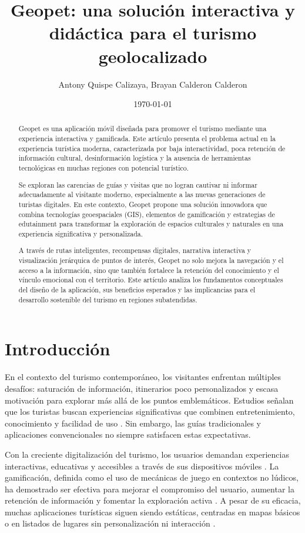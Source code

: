 \documentclass[12pt]{article}
\title{Geopet: una solución interactiva y didáctica para el turismo geolocalizado}
\author{Antony Quispe Calizaya, Brayan Calderon Calderon}
\date{\today}
\begin{document}
\maketitle

\begin{abstract}
Geopet es una aplicación móvil diseñada para promover el turismo mediante una experiencia interactiva y gamificada. Este artículo presenta el problema actual en la experiencia turística moderna, caracterizada por baja interactividad, poca retención de información cultural, desinformación logística y la ausencia de herramientas tecnológicas en muchas regiones con potencial turístico.

Se exploran las carencias de guías y visitas  que no logran cautivar ni informar adecuadamente al visitante moderno, especialmente a las nuevas generaciones de turistas digitales. En este contexto, Geopet propone una solución innovadora que combina tecnologías geoespaciales (GIS), elementos de gamificación y estrategias de edutainment para transformar la exploración de espacios culturales y naturales en una experiencia significativa y personalizada.

A través de rutas inteligentes, recompensas digitales, narrativa interactiva y visualización jerárquica de puntos de interés, Geopet no solo mejora la navegación y el acceso a la información, sino que también fortalece la retención del conocimiento y el vínculo emocional con el territorio. Este artículo analiza los fundamentos conceptuales del diseño de la aplicación, sus beneficios esperados y las implicancias para el desarrollo sostenible del turismo en regiones subatendidas.
\end{abstract}

\vspace{1cm}
\section{Introducción}
En el contexto del turismo contemporáneo, los visitantes enfrentan múltiples desafíos: saturación de información, itinerarios poco personalizados y escasa motivación para explorar más allá de los puntos emblemáticos. Estudios señalan que los turistas buscan experiencias significativas que combinen entretenimiento, conocimiento y facilidad de uso \cite{Xu2015,Pradhan2023}. Sin embargo, las guías tradicionales y aplicaciones convencionales no siempre satisfacen estas expectativas.

Con la creciente digitalización del turismo, los usuarios demandan experiencias interactivas, educativas y accesibles a través de sus dispositivos móviles \cite{Fishoeder2018,Frontiers2024}. La gamificación, definida como el uso de mecánicas de juego en contextos no lúdicos, ha demostrado ser efectiva para mejorar el compromiso del usuario, aumentar la retención de información y fomentar la exploración activa \cite{Weber2017,Swacha2017}. A pesar de su eficacia, muchas aplicaciones turísticas siguen siendo estáticas, centradas en mapas básicos o en listados de lugares sin personalización ni interacción \cite{Xu2014,Architecture2019}.
\end{document}
